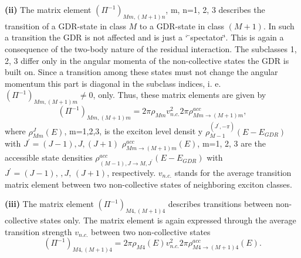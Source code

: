 \smallskip \textbf{(ii)} The matrix element $(\Pi^{-1})_{Mm,(M+1)n}$, m,
n=1, 2, 3 describes the transition of a GDR-state in class $M$ to a
GDR-state in class $(M+1)$. In such a transition the GDR is not affected and
is just a \char`%
\"{}spectator\char`\"{}. This is again a consequence of the two-body nature
of the residual interaction. The subclasses 1, 2, 3 differ only in the
angular momenta of the non-collective states the GDR is built on. Since a
transition among these states must not change the angular momentum this part
is diagonal in the subclass indices, i. e. $(\Pi^{-1})_{Mm,(M+1)m}\not=0$,
only. Thus, these matrix elements are given by
\begin{equation}
(\Pi^{-1})_{Mm,(M+1)m}=2\pi\rho_{Mm}v_{n.c.}^{2}2\pi\rho_{Mm%
\rightarrow(M+1)m}^{acc},
\end{equation}
where $\rho_{Mm}^{J}(E)$, m=1,2,3, is the exciton level densit%
y $\rho_{M-1}^{(J^{\prime},-\pi)}(E-E_{GDR})$
with $J^{\prime}=(J-1),J,(J+1)$ $\rho_{Mm\rightarrow(M+1)m}^{acc}(E)$, m=1,
2, 3 are the accessible state densities $\rho_{(M-1),J\rightarrow
M,J^{\prime}}^{acc}(E-E_{GDR})$ with $J^{\prime}=(J-1),\,,J,\,(J+1)$,
respectively. $v_{n.c.}$ stands for the average transition matrix element
between two non-collective states of neighboring exciton classes.

\smallskip \textbf{(iii)} The matrix element $(\Pi^{-1})_{M4,(M+1)4}$
describes transitions between non-collective states only. The matrix element
is again expressed through the average transition strength $v_{n.c.}$
between two non-collective states
\begin{equation}
(\Pi^{-1})_{M4,(M+1)4}=2\pi\rho_{M4}(E)v_{n.c.}^{2}2\pi\rho_{M4%
\rightarrow(M+1)4}^{acc}(E).
\end{equation}

